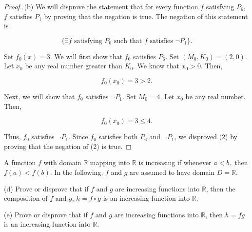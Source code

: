 \documentclass[12pt]{article}
\newenvironment{problem}[2][Problem]{\begin{trivlist}
\item[\hskip \labelsep {\bfseries #1}\hskip \labelsep {\bfseries #2.}]}{\end{trivlist}}
\begin{document}
\newpage

\begin{proof}

(b) We will disprove the statement that for every function $f$ satisfying $P_6$, $f$ satisfies $P_1$ by proving that the negation is true. The negation of this statement is 

$$\{ \exists f \text{ satisfying } P_6 \text{ such that } f \text{ satisfies } \lnot P_1 \}.$$


Set $f_0(x)=3$. We will first show that $f_0$ satisfies $P_6$. Set $(M_0, K_0)=(2,0)$. Let $x_0$ be any real number greater than $K_0$. We know that $x_0 > 0$. Then,

$$f_0(x_0)=3>2.$$

Next, we will show that $f_0$ satisfies $\lnot P_1$. Set $M_0=4$. Let $x_0$ be any real number. Then,

$$f_0(x_0)=3 \leq 4.$$

Thus, $f_0$ satisfies $\lnot P_1$. Since $f_0$ satisfies both $P_6$ and $\lnot P_1$, we disproved (2) by proving that the negation of (2) is true.

\end{proof}

\newpage
\begin{problem}{10}
A function $f$ with domain $\mathbb{R}$ mapping into $\mathbb{R}$ is increasing if whenever $a < b,$ then $f(a) < f(b).$ In the following, $f$ and $g$ are assumed
to have domain $D = \mathbb{R}$.

(d) Prove or disprove that if $f$ and $g$ are increasing functions into $\mathbb{R}$, then the composition of $f$ and $g$, $h = f \circ g$ is an increasing function into $\mathbb{R}$.

(e) Prove or disprove that if $f$ and $g$ are increasing functions into $\mathbb{R}$,
then $h = fg$ is an increasing function into $\mathbb{R}$.

\end{problem}
\end{document}
